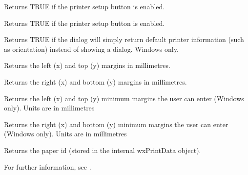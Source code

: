 Returns TRUE if the printer setup button is enabled.

\label{wxpagesetupdialogdatagetenablehelp}


Returns TRUE if the printer setup button is enabled.

\label{wxpagesetupdialogdatagetdefaultinfo}


Returns TRUE if the dialog will simply return default printer information (such as orientation)
instead of showing a dialog. Windows only.

\label{wxpagesetupdialogdatagetmargintopleft}


Returns the left (x) and top (y) margins in millimetres.

\label{wxpagesetupdialogdatagetmarginbottomright}


Returns the right (x) and bottom (y) margins in millimetres.

\label{wxpagesetupdialogdatagetminmargintopleft}


Returns the left (x) and top (y) minimum margins the user can enter (Windows only). Units
are in millimetres

\label{wxpagesetupdialogdatagetminmarginbottomright}


Returns the right (x) and bottom (y) minimum margins the user can enter (Windows only). Units
are in millimetres

\label{wxpagesetupdialogdatagetpaperid}


Returns the paper id (stored in the internal wxPrintData object).

For further information, see .

